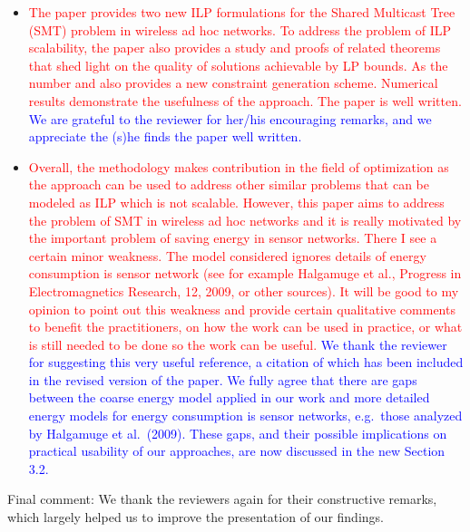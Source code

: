 \documentclass[12pt]{article}
\begin{document}
\begin{itemize}
\item \textcolor{red}{The paper provides two new ILP formulations for the Shared Multicast Tree (SMT) problem in wireless ad hoc networks.
To address the problem of ILP scalability, the paper also provides a study and proofs of related theorems that shed light on the quality of
solutions achievable by  LP  bounds.
As the number and also provides a new constraint generation scheme.
Numerical results demonstrate the usefulness of the approach. The paper is well written.} \textcolor{blue}{
We are grateful to the reviewer for her/his encouraging remarks, and we appreciate the (s)he finds the paper well written.
}
\item \textcolor{red}{Overall, the methodology makes contribution in the field of optimization as the approach can be used to address other similar problems
that can be modeled as ILP which is not scalable.
However, this paper aims to address the problem of SMT in wireless ad hoc networks and it is
really motivated by the important problem of saving energy in sensor networks.
There I see a certain minor weakness.
The model considered ignores details of energy consumption is sensor network
(see for example Halgamuge et al., Progress in Electromagnetics Research, 12, 2009, or other sources).
It will be good to my opinion to point out this weakness and provide certain qualitative comments to benefit the practitioners,
on how the work can be used in practice, or what is still needed to be done so the work can be useful.} \textcolor{blue}{
We thank the reviewer for suggesting this very useful reference, a citation of which has been included in the revised version of the paper.
We fully agree that there are gaps between the coarse energy model applied in our work and more detailed energy models for energy consumption is sensor networks,
e.g.\ those analyzed by Halgamuge et al.\ (2009).
These gaps, and their possible implications on practical usability of our approaches, are now discussed in the new Section 3.2.
}
\end{itemize}

\noindent
Final comment: We thank the reviewers again for their constructive remarks, which largely helped us to improve the presentation of our findings.
\end{document}
